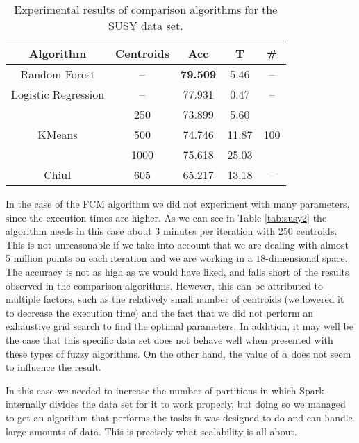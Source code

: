 \begin{table}[h!]
\centering
\caption{Experimental results of comparison algorithms for the SUSY data set.}
\label{tab:susy1}
\begin{tabular}{ccccc}
\toprule
Algorithm & Centroids & Acc & T & \#\\ \midrule
Random Forest                      & --                   & \textbf{79.509}                    & 5.46       & --\\
Logistic Regression                    & --                   & 77.931                   & 0.47       & --                    \\
\multirow{3}{*}{KMeans} & 250                  & 73.899   & 5.60      & \multirow{3}{*}{100} \\
                        & 500                  & 74.746        & 11.87       &                      \\
                        & 1000                  & 75.618                      & 25.03      &                      \\
ChiuI                   & 605                 & 65.217                       & 13.18       & --                    \\ \bottomrule
\end{tabular}
\end{table}

In the case of the FCM algorithm we did not experiment with many parameters, since the execution times are higher. As we can see in Table \ref{tab:susy2} the algorithm needs in this case about 3 minutes per iteration with 250 centroids. This is not unreasonable if we take into account that we are dealing with almost 5 million points on each iteration and we are working in a $18$-dimensional space. The accuracy is not as high as we would have liked, and falls short of the results observed in the comparison algorithms. However, this can be attributed to multiple factors, such as the relatively small number of centroids (we lowered it to decrease the execution time) and the fact that we did not perform an exhaustive grid search to find the optimal parameters. In addition, it may well be the case that this specific data set does not behave well when presented with these types of fuzzy algorithms. On the other hand, the value of $\alpha$ does not seem to influence the result.

In this case we needed to increase the number of partitions in which Spark internally divides the data set for it to work properly, but doing so we managed to get an algorithm that performs the tasks it was designed to do and can handle large amounts of data. This is precisely what scalability is all about.

